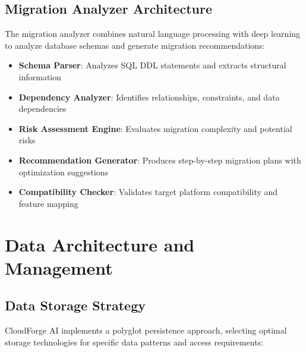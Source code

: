 \subsection{Migration Analyzer Architecture}

The migration analyzer combines natural language processing with deep learning to analyze database schemas and generate migration recommendations:

\begin{itemize}
    \item \textbf{Schema Parser}: Analyzes SQL DDL statements and extracts structural information
    \item \textbf{Dependency Analyzer}: Identifies relationships, constraints, and data dependencies
    \item \textbf{Risk Assessment Engine}: Evaluates migration complexity and potential risks
    \item \textbf{Recommendation Generator}: Produces step-by-step migration plans with optimization suggestions
    \item \textbf{Compatibility Checker}: Validates target platform compatibility and feature mapping
\end{itemize}

\section{Data Architecture and Management}

\subsection{Data Storage Strategy}

CloudForge AI implements a polyglot persistence approach, selecting optimal storage technologies for specific data patterns and access requirements:

